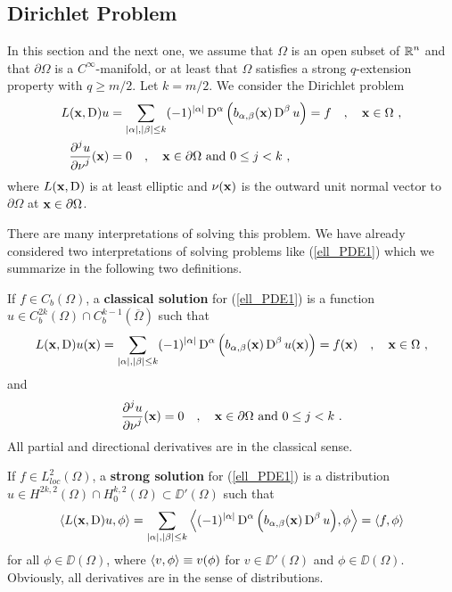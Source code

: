\subsection{Dirichlet Problem}

In this section and the next one, we assume that $\Omega$ is an open
subset of $\displaystyle \mathbb{R}^n$ and that $\partial \Omega$ is a
$\displaystyle C^\infty$-manifold, or at least that $\Omega$ satisfies
a strong $q$-extension property with $q\geq m/2$.  Let $k = m/2$.
We consider the Dirichlet problem
\begin{equation} \label{ell_PDE1}
\begin{split}
L(\mathbf{x}, \operatorname{D})u &= \sum_{|\alpha|,|\beta|\leq k} (-1)^{|\alpha|} \operatorname{D}^\alpha
\left( b_{\alpha,\beta}(\mathbf{x}) \operatorname{D}^\beta u\right) = f \quad , \quad
\mathbf{x} \in \Omega \ ,\\
\frac{\displaystyle \partial^{j}{u}} {\displaystyle \partial \mathbf{\nu}^{j}}(\mathbf{x}) &= 0 \quad , \quad
\mathbf{x} \in \partial \Omega \ \text{and}\  0 \leq j < k \ ,
\end{split}
\end{equation}
where $L(\mathbf{x}, \operatorname{D})$ is at least elliptic and $\mathbf{\nu}(\mathbf{x})$ is
the outward unit normal vector to $\partial \Omega$ at
$\mathbf{x} \in \partial \Omega$.

There are many interpretations of solving this problem.  We have already
considered two interpretations of solving problems like (\ref{ell_PDE1})
which we summarize in the following two definitions.

\begin{defn}
If $f \in C_b(\Omega)$, a {\bfseries classical solution}
for (\ref{ell_PDE1}) is a function
$\displaystyle u \in C^{2k}_b(\Omega) \cap C^{k-1}_b(\overline{\Omega})$
such that
\[
L(\mathbf{x},\operatorname{D})u(\mathbf{x}) = \sum_{|\alpha|,|\beta|\leq k}
(-1)^{|\alpha|} \operatorname{D}^\alpha
\left( b_{\alpha,\beta}(\mathbf{x}) \operatorname{D}^\beta u(\mathbf{x}) \right) =
f(\mathbf{x}) \quad , \quad \mathbf{x} \in \Omega \ ,
\]
and
\[
\frac{\displaystyle \partial^{j}{u}} {\displaystyle \partial \mathbf{\nu}^{j}}(\mathbf{x}) = 0 \quad , \quad
\mathbf{x} \in \partial \Omega \ \text{and}\ 0 \leq j < k \ .
\]
All partial and directional derivatives are in the classical sense.
\end{defn}

\begin{defn}
If $\displaystyle f\in L_{loc}^2(\Omega)$, a {\bfseries strong solution}
for (\ref{ell_PDE1}) is a distribution
$\displaystyle u \in H^{2k,2}(\Omega) \cap H^{k,2}_0(\Omega) \subset
\DD'(\Omega)$ such that
\[
\left\langle{ L(\mathbf{x},\operatorname{D})u} , {\phi}\right\rangle =
\sum_{|\alpha|,|\beta|\leq k} \left\langle{ (-1)^{|\alpha|} \operatorname{D}^\alpha
\left( b_{\alpha,\beta}(\mathbf{x}) \operatorname{D}^\beta u \right) } , {\phi}\right\rangle = \left\langle{f} , {\phi}\right\rangle
\]
for all $\displaystyle \phi \in \DD(\Omega)$,
where $\left\langle{v} , {\phi}\right\rangle \equiv v(\phi)$ for $v\in \DD'(\Omega)$ and
$\phi \in \DD(\Omega)$.  Obviously, all derivatives are in the sense
of distributions.
\end{defn}

